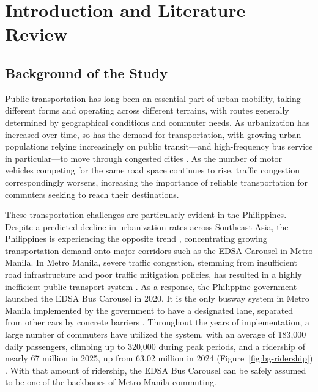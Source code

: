 \chapter{Introduction and Literature Review}


\section{Background of the Study}\label{sec:background}
Public transportation has long been an essential part of urban mobility, taking different forms and operating across different terrains, with routes generally determined by geographical conditions and commuter needs. As urbanization has increased over time, so has the demand for transportation, with growing urban populations relying increasingly on public transit---and high-frequency bus service in particular---to move through congested cities \cite{Cervero2000}. As the number of motor vehicles competing for the same road space continues to rise, traffic congestion correspondingly worsens, increasing the importance of reliable transportation for commuters seeking to reach their destinations.

These transportation challenges are particularly evident in the Philippines. Despite a predicted decline in urbanization rates across Southeast Asia, the Philippines is experiencing the opposite trend \cite{UN_WUP2018}, concentrating growing transportation demand onto major corridors such as the EDSA Carousel in Metro Manila. In Metro Manila, severe traffic congestion, stemming from insufficient road infrastructure and poor traffic mitigation policies, has resulted in a highly inefficient public transport system \cite{Spatio2026}. As a response, the Philippine government launched the EDSA Bus Carousel in 2020. It is the only busway system in Metro Manila implemented by the government to have a designated lane, separated from other cars by concrete barriers \cite{Chua2026}. Throughout the years of implementation, a large number of commuters have utilized the system, with an average of 183{,}000 daily passengers, climbing up to 320{,}000 during peak periods, and a ridership of nearly 67 million in 2025, up from 63.02 million in 2024 (Figure~\ref{fig:bg-ridership}) \cite{DOTr2025Ridership}. With that amount of ridership, the EDSA Bus Carousel can be safely assumed to be one of the backbones of Metro Manila commuting.

